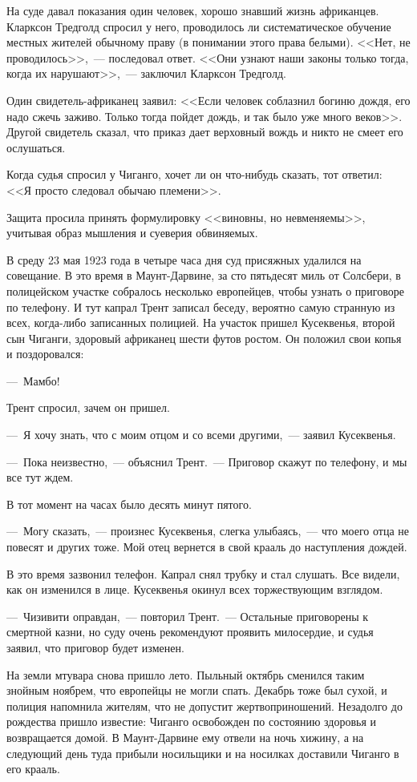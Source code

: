 \documentclass[12pt,a4paper,twoside,openany,svgnames]{memoir}
\begin{document}
На суде давал показания один человек, хорошо знавший жизнь африканцев. Кларксон Тредголд спросил у него, проводилось ли систематическое обучение местных жителей обычному праву (в понимании этого права белыми). <<Нет, не проводилось>>,~--- последовал ответ. <<Они узнают наши законы только тогда, когда их нарушают>>,~--- заключил Кларксон Тредголд.

Один свидетель-африканец заявил: <<Если человек соблазнил богиню дождя, его надо сжечь заживо. Только тогда пойдет дождь, и так было уже много веков>>. Другой свидетель сказал, что приказ дает верховный вождь и никто не смеет его ослушаться.

Когда судья спросил у Чиганго, хочет ли он что-нибудь сказать, тот ответил: <<Я просто следовал обычаю племени>>.

Защита просила принять формулировку <<виновны, но невменяемы>>, учитывая образ мышления и суеверия обвиняемых.

В среду 23 мая 1923 года в четыре часа дня суд присяжных удалился на совещание. В это время в Маунт-Дарвине, за сто пятьдесят миль от Солсбери, в полицейском участке собралось несколько европейцев, чтобы узнать о приговоре по телефону. И тут капрал Трент записал беседу, вероятно самую странную из всех, когда-либо записанных полицией. На участок пришел Кусеквенья, второй сын Чиганги, здоровый африканец шести футов ростом. Он положил свои копья и поздоровался:

---~Мамбо!

Трент спросил, зачем он пришел.

---~Я хочу знать, что с моим отцом и со всеми другими,~--- заявил Кусеквенья.

---~Пока неизвестно,~--- объяснил Трент.~--- Приговор скажут по телефону, и мы все тут ждем.

В тот момент на часах было десять минут пятого.

---~Могу сказать,~--- произнес Кусеквенья, слегка улыбаясь,~--- что моего отца не повесят и других тоже. Мой отец вернется в свой крааль до наступления дождей.

В это время зазвонил телефон. Капрал снял трубку и стал слушать. Все видели, как он изменился в лице. Кусеквенья окинул всех торжествующим взглядом.

---~Чизивити оправдан,~--- повторил Трент.~--- Остальные приговорены к смертной казни, но суду очень рекомендуют проявить милосердие, и судья заявил, что приговор будет изменен.

На земли мтувара снова пришло лето. Пыльный октябрь сменился таким знойным ноябрем, что европейцы не могли спать. Декабрь тоже был сухой, и полиция напомнила жителям, что не допустит жертвоприношений. Незадолго до рождества пришло известие: Чиганго освобожден по состоянию здоровья и возвращается домой. В Маунт-Дарвине ему отвели на ночь хижину, а на следующий день туда прибыли носильщики и на носилках доставили Чиганго в его крааль.
\end{document}
